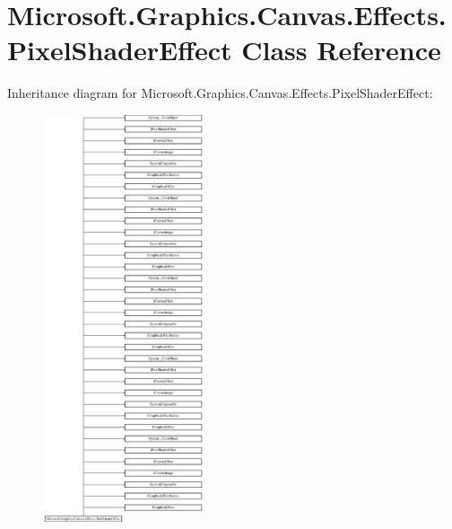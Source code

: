 \hypertarget{class_microsoft_1_1_graphics_1_1_canvas_1_1_effects_1_1_pixel_shader_effect}{}\section{Microsoft.\+Graphics.\+Canvas.\+Effects.\+Pixel\+Shader\+Effect Class Reference}
\label{class_microsoft_1_1_graphics_1_1_canvas_1_1_effects_1_1_pixel_shader_effect}
Inheritance diagram for Microsoft.\+Graphics.\+Canvas.\+Effects.\+Pixel\+Shader\+Effect\+:\begin{figure}[H]
\begin{center}
\leavevmode
\includegraphics[height=12.000000cm]{class_microsoft_1_1_graphics_1_1_canvas_1_1_effects_1_1_pixel_shader_effect}
\end{center}
\end{figure}
